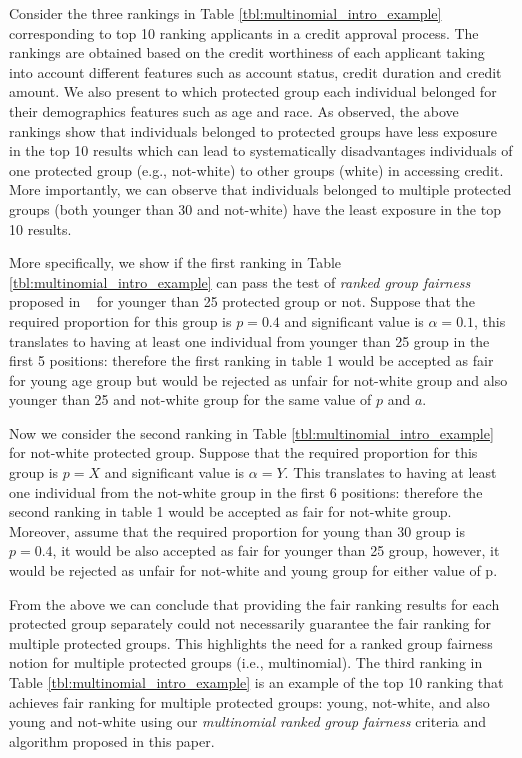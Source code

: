 \begin{example} Consider the three rankings in Table \ref{tbl:multinomial_intro_example} corresponding to top 10 ranking applicants in a credit approval process. The rankings are obtained based on the credit worthiness of each applicant taking into account different features such as account status, credit duration and credit amount. 
	We also present to which protected group each individual belonged for their demographics features such as age and race. As observed, the above rankings show that individuals belonged to protected groups have less exposure in the top 10 results which can lead to systematically disadvantages individuals of one protected group (e.g., not-white) to other groups (white) in accessing credit. More importantly, we can observe that individuals belonged to multiple protected groups (both younger than 30 and not-white) have the least exposure in the top 10 results.
	
	More specifically, we show if the first ranking in Table \ref{tbl:multinomial_intro_example} can pass the test of \textit{ranked group fairness} proposed in ~\cite{zehlike2017fair} for younger than 25 protected group or not. Suppose that the required proportion for this group is $p = 0.4$ and significant value is $\alpha = 0.1$, this translates to having at least one individual from younger than 25 group in the first 5 positions: therefore the first ranking in table 1 would be accepted as fair for young age group but would be rejected as unfair for not-white group and also younger than 25 and not-white group for the same value of $p$ and $a$.
	
	Now we consider the second ranking in Table \ref{tbl:multinomial_intro_example} for not-white protected group. Suppose that the required proportion for this group is $p = X$ and significant value is $\alpha = Y$. This translates to having at least one individual from the not-white group in the first 6 positions: therefore the second ranking in table 1 would be accepted as fair for not-white group. Moreover, assume that 
	the required proportion for young than 30 group is $p = 0.4$, it would be also accepted as fair for younger than 25 group, however, it would be rejected as unfair for not-white and young group for either value of p.
	
	From the above we can conclude that providing the fair ranking results for each protected group separately could not necessarily guarantee the fair ranking for multiple protected groups. This highlights the need for a ranked group fairness notion for multiple protected groups (i.e., multinomial). The third ranking in Table \ref{tbl:multinomial_intro_example} is an example of the top 10 ranking that achieves fair ranking for multiple protected groups: young, not-white, and also young and not-white using our \textit{multinomial ranked group fairness} criteria and algorithm proposed in this paper. 
	
\end{example}
\medskip

